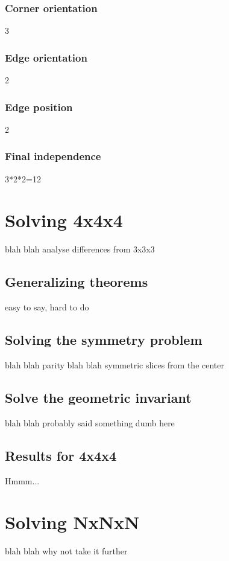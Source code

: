 \documentclass{article}
\begin{document}
            \subsubsection{Corner orientation}
                3

            \subsubsection{Edge orientation}
                2

            \subsubsection{Edge position}
                2

            \subsubsection{Final independence}
                3*2*2=12
    
    \section{Solving 4x4x4}
        blah blah analyse differences from 3x3x3

        \subsection{Generalizing theorems}
            easy to say, hard to do

        \subsection{Solving the symmetry problem}
            blah blah parity blah blah symmetric slices from the center
        
        \subsection{Solve the geometric invariant}
            blah blah probably said something dumb here

        \subsection{Results for 4x4x4}
            Hmmm...

    \section{Solving NxNxN}
        blah blah why not take it further
\end{document}
